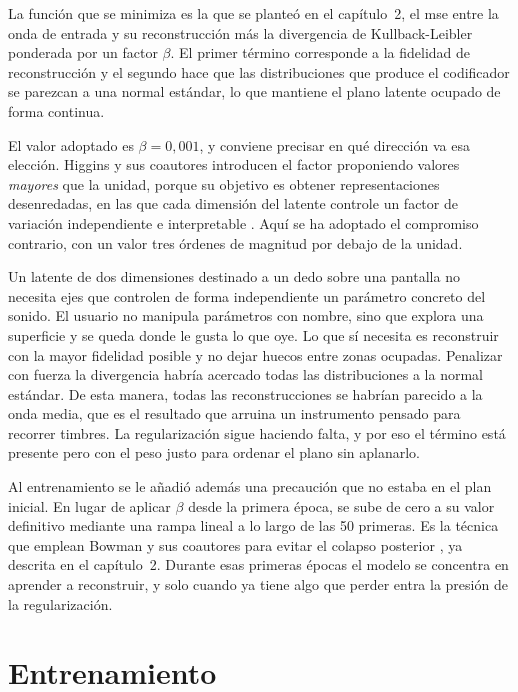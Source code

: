 La función que se minimiza es la que se planteó en el capítulo~2, el \gls{mse}
entre la onda de entrada y su reconstrucción más la divergencia de
Kullback-Leibler ponderada por un factor $\beta$. El primer término corresponde a la
fidelidad de reconstrucción y el segundo hace que las distribuciones que produce el codificador se
parezcan a una normal estándar, lo que mantiene el plano latente ocupado de
forma continua.

El valor adoptado es $\beta = 0{,}001$, y conviene precisar en qué dirección va
esa elección. Higgins y sus coautores introducen el factor proponiendo valores
\emph{mayores} que la unidad, porque su objetivo es obtener representaciones
desenredadas, en las que cada dimensión del latente controle un factor de
variación independiente e interpretable \cite{Higgins2017}. Aquí se ha adoptado
el compromiso contrario, con un valor tres órdenes de magnitud por debajo de la
unidad.

Un latente de dos dimensiones destinado a un dedo sobre una pantalla no necesita 
ejes que controlen de forma independiente un parámetro concreto del sonido.
El usuario no manipula parámetros con nombre, sino que explora
una superficie y se queda donde le gusta lo que oye. Lo que sí necesita es
reconstruir con la mayor fidelidad posible y no dejar huecos entre zonas
ocupadas. Penalizar con fuerza la divergencia habría acercado todas las
distribuciones a la normal estándar. De esta manera, todas las reconstrucciones se
habrían parecido a la onda media, que es el resultado que arruina un instrumento pensado para
recorrer timbres. La regularización sigue haciendo falta, y por eso el término
está presente pero con el peso justo para ordenar el plano sin aplanarlo.

Al entrenamiento se le añadió además una precaución que no estaba en el plan
inicial. En lugar de aplicar $\beta$ desde la primera época, se sube de cero a
su valor definitivo mediante una rampa lineal a lo largo de las 50 primeras. Es
la técnica que emplean Bowman y sus coautores para evitar el colapso posterior
\cite{Bowman2016}, ya descrita en el capítulo~2. Durante esas primeras épocas el
modelo se concentra en aprender a reconstruir, y solo cuando ya tiene algo que
perder entra la presión de la regularización.

\section{Entrenamiento}
\label{sec:entrenamiento}


